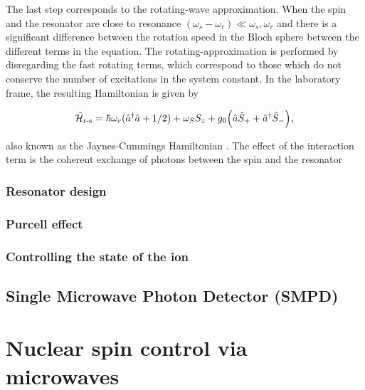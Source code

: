 The last step corresponds to the rotating-wave approximation. When the spin and the resonator are close to resonance $(\omega_{s}-\omega_{r}) \ll \omega_{s}, \omega_r$ and there is a significant difference between the rotation speed in the Bloch sphere between the different terms in the equation. The rotating-approximation is performed by disregarding the fast rotating terms, which correspond to those which do not conserve the number of excitations in the system constant.  In the laboratory frame, the resulting Hamiltonian is given by

\begin{equation}
    \hat{\mathcal{H}}_{\text{r-s}} = \hbar\omega_r(\hat{a}^\dagger \hat{a} + 1/2) +  \omega_S S_z + g_{0} \Big( \hat{a}\hat{S}_{+} + \hat{a}^{\dagger}\hat{S}_{-} \Big), \\
\end{equation}

\noindent also known as the Jaynes-Cummings Hamiltonian . The effect of the interaction term is the coherent exchange of photons between the spin and the resonator

\subsection{Resonator design}

\subsection{Purcell effect}

\subsection{Controlling the state of the \Er ion}

\section{Single Microwave Photon Detector (SMPD)}

\setchapterpreamble[u]{\margintoc}
\chapter{Nuclear spin control via microwaves}

